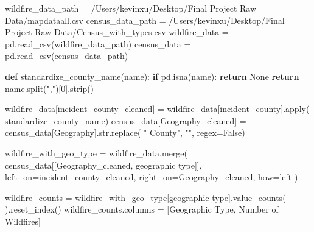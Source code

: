 \documentclass[
  letterpaper,
  DIV=11,
  numbers=noendperiod]{scrartcl}
\newenvironment{Shaded}{\begin{snugshade}}{\end{snugshade}}
\newcommand{\BuiltInTok}[1]{\textcolor[rgb]{0.00,0.23,0.31}{#1}}
\newcommand{\ControlFlowTok}[1]{\textcolor[rgb]{0.00,0.23,0.31}{\textbf{#1}}}
\newcommand{\DecValTok}[1]{\textcolor[rgb]{0.68,0.00,0.00}{#1}}
\newcommand{\KeywordTok}[1]{\textcolor[rgb]{0.00,0.23,0.31}{\textbf{#1}}}
\newcommand{\NormalTok}[1]{\textcolor[rgb]{0.00,0.23,0.31}{#1}}
\newcommand{\OperatorTok}[1]{\textcolor[rgb]{0.37,0.37,0.37}{#1}}
\newcommand{\StringTok}[1]{\textcolor[rgb]{0.13,0.47,0.30}{#1}}
\newcommand{\VariableTok}[1]{\textcolor[rgb]{0.07,0.07,0.07}{#1}}
\begin{document}
\begin{Shaded}
\begin{Highlighting}[]
\NormalTok{wildfire\_data\_path }\OperatorTok{=} \StringTok{\textquotesingle{}/Users/kevinxu/Desktop/Final Project Raw Data/mapdataall.csv\textquotesingle{}}
\NormalTok{census\_data\_path }\OperatorTok{=} \StringTok{\textquotesingle{}/Users/kevinxu/Desktop/Final Project Raw Data/Census\_with\_types.csv\textquotesingle{}}
\NormalTok{wildfire\_data }\OperatorTok{=}\NormalTok{ pd.read\_csv(wildfire\_data\_path)}
\NormalTok{census\_data }\OperatorTok{=}\NormalTok{ pd.read\_csv(census\_data\_path)}


\KeywordTok{def}\NormalTok{ standardize\_county\_name(name):}
    \ControlFlowTok{if}\NormalTok{ pd.isna(name):}
        \ControlFlowTok{return} \VariableTok{None}
    \ControlFlowTok{return}\NormalTok{ name.split(}\StringTok{","}\NormalTok{)[}\DecValTok{0}\NormalTok{].strip()}


\NormalTok{wildfire\_data[}\StringTok{\textquotesingle{}incident\_county\_cleaned\textquotesingle{}}\NormalTok{] }\OperatorTok{=}\NormalTok{ wildfire\_data[}\StringTok{\textquotesingle{}incident\_county\textquotesingle{}}\NormalTok{].}\BuiltInTok{apply}\NormalTok{(}
\NormalTok{    standardize\_county\_name)}
\NormalTok{census\_data[}\StringTok{\textquotesingle{}Geography\_cleaned\textquotesingle{}}\NormalTok{] }\OperatorTok{=}\NormalTok{ census\_data[}\StringTok{\textquotesingle{}Geography\textquotesingle{}}\NormalTok{].}\BuiltInTok{str}\NormalTok{.replace(}
    \StringTok{" County"}\NormalTok{, }\StringTok{""}\NormalTok{, regex}\OperatorTok{=}\VariableTok{False}\NormalTok{)}

\NormalTok{wildfire\_with\_geo\_type }\OperatorTok{=}\NormalTok{ wildfire\_data.merge(}
\NormalTok{    census\_data[[}\StringTok{\textquotesingle{}Geography\_cleaned\textquotesingle{}}\NormalTok{, }\StringTok{\textquotesingle{}geographic type\textquotesingle{}}\NormalTok{]],}
\NormalTok{    left\_on}\OperatorTok{=}\StringTok{\textquotesingle{}incident\_county\_cleaned\textquotesingle{}}\NormalTok{,}
\NormalTok{    right\_on}\OperatorTok{=}\StringTok{\textquotesingle{}Geography\_cleaned\textquotesingle{}}\NormalTok{,}
\NormalTok{    how}\OperatorTok{=}\StringTok{\textquotesingle{}left\textquotesingle{}}
\NormalTok{)}

\NormalTok{wildfire\_counts }\OperatorTok{=}\NormalTok{ wildfire\_with\_geo\_type[}\StringTok{\textquotesingle{}geographic type\textquotesingle{}}\NormalTok{].value\_counts(}
\NormalTok{).reset\_index()}
\NormalTok{wildfire\_counts.columns }\OperatorTok{=}\NormalTok{ [}\StringTok{\textquotesingle{}Geographic Type\textquotesingle{}}\NormalTok{, }\StringTok{\textquotesingle{}Number of Wildfires\textquotesingle{}}\NormalTok{]}


\end{Highlighting}
\end{Shaded}
\end{document}
